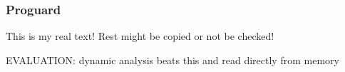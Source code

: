 \subsubsection{Proguard} \label{subsubsection:evaluation-reengineering-optobf-proguard}
This is my real text! Rest might be copied or not be checked!

EVALUATION:  dynamic analysis beats this and read directly from memory\newline
